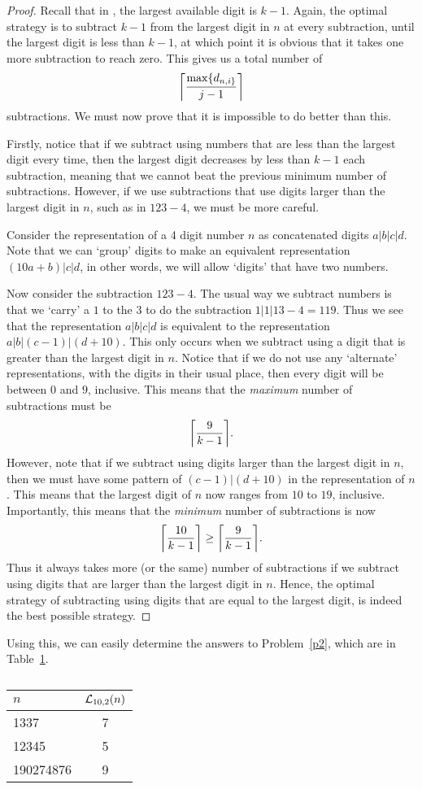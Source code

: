 \documentclass{article}
\begin{document}
\begin{proof}
  Recall that in \NTen{}, the largest available digit is $k-1$. Again, the optimal strategy is to subtract $k-1$ from the largest digit in $n$ at every subtraction, until the largest digit is less than $k-1$, at which point it is obvious that it takes one more subtraction to reach zero. This gives us a total number of \[
    \ceil*{\frac{\max\{d_{n, i\}}}{j-1}}
  \] subtractions. We must now prove that it is impossible to do better than this. 

  Firstly, notice that if we subtract using numbers that are less than the largest digit every time, then the largest digit decreases by less than $k-1 $ each subtraction, meaning that we cannot beat the previous minimum number of subtractions. However, if we use subtractions that use digits larger than the largest digit in $n$, such as in $123-4$, we must be more careful.

  Consider the representation of a 4 digit number $n$ as concatenated digits $a|b|c|d$. Note that we can `group' digits to make an equivalent representation $(10a + b)|c|d$, in other words, we will allow `digits' that have two numbers.

  Now consider the subtraction $123-4$. The usual way we subtract numbers is that we `carry' a $1$ to the $3$ to do the subtraction $1|1|13 - 4 = 119$. Thus we see that the representation $a|b|c|d$ is equivalent to the representation $a|b|(c-1)|(d+10)$. This only occurs when we subtract using a digit that is greater than the largest digit in $n$. Notice that if we do not use any `alternate' representations, with the digits in their usual place, then every digit will be between $0$ and $9$, inclusive. This means that the \emph{maximum} number of subtractions must be \[
    \ceil*{\frac{9}{k-1}}
  .\] However, note that if we subtract using digits larger than the largest digit in  $n$, then we must have some pattern of  $(c-1)|(d+10)$ in the representation of  $n$. This means that the largest digit of $n$ now ranges from $10$ to $19$, inclusive. Importantly, this means that the \emph{minimum} number of subtractions is now \[
  \ceil*{\frac{10}{k-1}} \ge \ceil*{\frac{9}{k-1}}
  .\] Thus it always takes more (or the same) number of subtractions if we subtract using digits that are larger than the largest digit in $n$. Hence, the optimal strategy of subtracting using digits that are equal to the largest digit, is indeed the best possible strategy.
\end{proof}
Using this, we can easily determine the answers to Problem~\ref{p2}, which are in Table~\ref{t1}.
\begin{table}[H]
  \centering
  \begin{tabular}{lc} \toprule
    $n$ & $\LTen(n)$ \\ \midrule
    1337 & 7 \\
    12345 & 5 \\
    190274876 & 9 \\ \bottomrule
  \end{tabular}
  \caption{}
  \label{t1}
\end{table}
\end{document}

